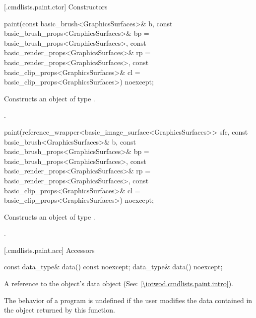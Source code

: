  [\iotwod.cmdlists.paint.ctor] {Constructors}%

%
\begin{itemdecl}
paint(const basic_brush<GraphicsSurfaces>& b,
  const basic_brush_props<GraphicsSurfaces>& bp = 
  basic_brush_props<GraphicsSurfaces>{},
  const basic_render_props<GraphicsSurfaces>& rp = 
  basic_render_props<GraphicsSurfaces>{},
  const basic_clip_props<GraphicsSurfaces>& cl = 
  basic_clip_props<GraphicsSurfaces>{}) noexcept;
\end{itemdecl}
\begin{itemdescr}
\pnum
\effects Constructs an object of type .

\pnum
\postconditions {}.
\end{itemdescr}

%
\begin{itemdecl}
paint(reference_wrapper<basic_image_surface<GraphicsSurfaces>> sfc,
  const basic_brush<GraphicsSurfaces>& b,
  const basic_brush_props<GraphicsSurfaces>& bp = 
  basic_brush_props<GraphicsSurfaces>{},
  const basic_render_props<GraphicsSurfaces>& rp = 
  basic_render_props<GraphicsSurfaces>{},
  const basic_clip_props<GraphicsSurfaces>& cl = 
  basic_clip_props<GraphicsSurfaces>{}) noexcept;
\end{itemdecl}
\begin{itemdescr}
\pnum
\effects Constructs an object of type .

\pnum
\postconditions {}.
\end{itemdescr}

 [\iotwod.cmdlists.paint.acc] {Accessors}%

%
\begin{itemdecl}
const data_type& data() const noexcept;
data_type& data() noexcept;
\end{itemdecl}
\begin{itemdescr}
\pnum
\returns A reference to the  object's data object (See: \ref{\iotwod.cmdlists.paint.intro}).

\pnum
\remarks The behavior of a program is undefined if the user modifies the data contained in the  object returned by this function.
\end{itemdescr}

